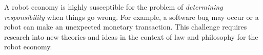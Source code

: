 A robot economy is highly susceptible for the problem of \textit{determining responsibility} when things go wrong. For example, a software bug may occur or a robot can make an unexpected monetary transaction. This challenge requires research into new theories and ideas in the context of law and philosophy for the robot economy.

